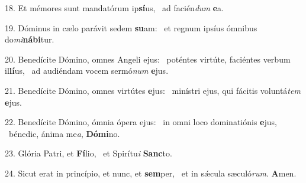 18. Et mémores sunt mandatórum ip\textbf{sí}us, \ast\  ad facién\textit{dum} \textbf{e}a.\

19. Dóminus in cælo parávit sedem \textbf{su}am: \ast\  et regnum ipsíus ómnibus do\textit{mi}\textbf{ná}\textbf{bi}tur.\

20. Benedícite Dómino, omnes Angeli ejus: \dag\  poténtes virtúte, faciéntes verbum il\textbf{lí}us, \ast\  ad audiéndam vocem sermó\textit{num} \textbf{e}jus.\

21. Benedícite Dómino, omnes virtútes \textbf{e}jus: \ast\  minístri ejus, qui fácitis voluntá\textit{tem} \textbf{e}jus.\

22. Benedícite Dómino, ómnia ópera ejus: \dag\  in omni loco dominatiónis \textbf{e}jus, \ast\  bénedic, ánima me\textit{a}, \textbf{Dó}\textbf{mi}no.\

23. Glória Patri, et \textbf{Fí}lio, \ast\  et Spirítu\textit{i} \textbf{Sanc}to.\

24. Sicut erat in princípio, et nunc, et \textbf{sem}per, \ast\  et in sǽcula sæculó\textit{rum}. \textbf{A}men.\

